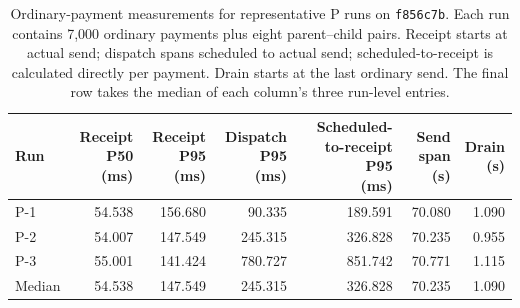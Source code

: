 \begin{table}[t]
\centering
\caption{Ordinary-payment measurements for representative P runs
on \texttt{f856c7b}. Each run contains 7,000 ordinary payments
plus eight parent--child pairs. Receipt starts at actual send;
dispatch spans scheduled to actual send; scheduled-to-receipt
is calculated directly per payment. Drain starts at the last
ordinary send. The final row takes the median of each column's
three run-level entries.}
\label{tab:current-p}
\small
\setlength{\tabcolsep}{5pt}
\begin{tabular}{lrrrrrr}
\toprule
Run &
\shortstack{Receipt P50\\(ms)} &
\shortstack{Receipt P95\\(ms)} &
\shortstack{Dispatch P95\\(ms)} &
\shortstack{Scheduled-to-receipt P95\\(ms)} &
\shortstack{Send span\\(s)} &
\shortstack{Drain\\(s)} \\
\midrule
P-1 & 54.538 & 156.680 &  90.335 & 189.591 & 70.080 & 1.090 \\
P-2 & 54.007 & 147.549 & 245.315 & 326.828 & 70.235 & 0.955 \\
P-3 & 55.001 & 141.424 & 780.727 & 851.742 & 70.771 & 1.115 \\
\midrule
Median & 54.538 & 147.549 & 245.315 & 326.828 & 70.235 & 1.090 \\
\bottomrule
\end{tabular}
\end{table}
